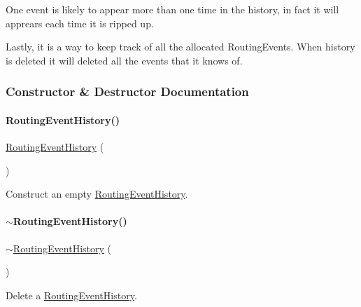 One event is likely to appear more than one time in the history, in fact it will apprears each time it is ripped up.

Lastly, it is a way to keep track of all the allocated Routing\+Events. When history is deleted it will deleted all the events that it knows of. 

\subsubsection{Constructor \& Destructor Documentation}
\mbox{\label{classKite_1_1RoutingEventHistory_af286a3887c4925a37eadc8018d584aa3}} 
\paragraph{\texorpdfstring{Routing\+Event\+History()}{RoutingEventHistory()}}
{\footnotesize\ttfamily \hyperlink{classKite_1_1RoutingEventHistory}{Routing\+Event\+History} (\begin{DoxyParamCaption}{ }\end{DoxyParamCaption})}

Construct an empty \hyperlink{classKite_1_1RoutingEventHistory}{Routing\+Event\+History}. \mbox{\label{classKite_1_1RoutingEventHistory_a5a7671b3e27e93b018cf407a7eba9ce7}} 
\paragraph{\texorpdfstring{$\sim$\+Routing\+Event\+History()}{~RoutingEventHistory()}}
{\footnotesize\ttfamily $\sim$\hyperlink{classKite_1_1RoutingEventHistory}{Routing\+Event\+History} (\begin{DoxyParamCaption}{ }\end{DoxyParamCaption})}

Delete a \hyperlink{classKite_1_1RoutingEventHistory}{Routing\+Event\+History}.

